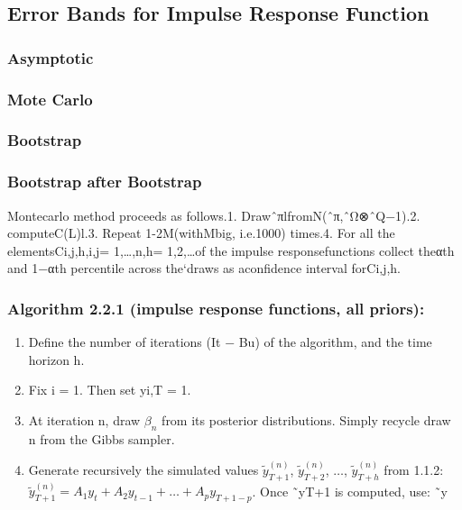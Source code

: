 \documentclass[
]{article}
\providecommand{\tightlist}{%
  \setlength{\itemsep}{0pt}\setlength{\parskip}{0pt}}
\begin{document}
\hypertarget{error-bands-for-impulse-response-function}{%
\subsection{Error Bands for Impulse Response Function}\label{error-bands-for-impulse-response-function}}

\hypertarget{irf_as_algo1}{%
\subsubsection{Asymptotic}\label{irf_as_algo1}}

\hypertarget{irf_mc_algo1}{%
\subsubsection{Mote Carlo}\label{irf_mc_algo1}}

\hypertarget{irf_boot_algo1}{%
\subsubsection{Bootstrap}\label{irf_boot_algo1}}

\hypertarget{irf_boot2_algo1}{%
\subsubsection{Bootstrap after Bootstrap}\label{irf_boot2_algo1}}

Montecarlo method proceeds as follows.1. DrawˆπlfromN(ˆπ,ˆΩ⊗ˆQ−1).2. computeC(L)l.3. Repeat 1-2M(withMbig, i.e.1000) times.4. For all the elementsCi,j,h,i,j= 1,\ldots,n,h= 1,2,\ldots of the impulse responsefunctions collect theαth and 1−αth percentile across the`draws as aconfidence interval forCi,j,h.

\hypertarget{algorithm-2.2.1-impulse-response-functions-all-priors}{%
\subsubsection{Algorithm 2.2.1 (impulse response functions, all priors):}\label{algorithm-2.2.1-impulse-response-functions-all-priors}}

\begin{enumerate}
\def\labelenumi{\arabic{enumi}.}
\tightlist
\item
  Define the number of iterations (It − Bu) of the algorithm, and the time horizon h.
\item
  Fix i = 1. Then set yi,T = 1.
\item
  At iteration n, draw \(\beta_{n}\) from its posterior distributions. Simply recycle draw n from the Gibbs sampler.
\item
  Generate recursively the simulated values \(\tilde{y}^{(n)}_{T+1}\), \(\tilde{y}^{(n)}_{T+2}\), \(\ldots\), \(\tilde{y}^{(n)}_{T+h}\) from 1.1.2: \(\tilde{y}^{(n)}_{T+1} = A_1y_t + A_2y_{t-1} + \ldots + A_py_{T+1-p}\). Once ˜yT+1 is computed, use: ˜y
\end{enumerate}
\end{document}

